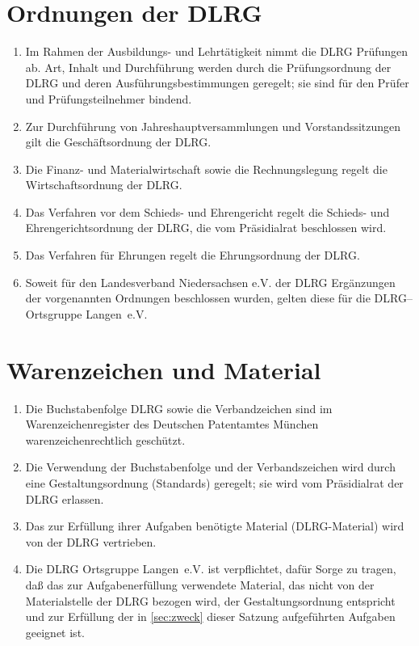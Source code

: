 \documentclass[%
12pt, %
a4paper, %
headsepline, %
footsepline, %
parskip, %
headings=normal, %
]{scrartcl}
\begin{document}
\section{Ordnungen der DLRG}
\label{sec:ordnungen}
\begin{enumerate}
    \item Im Rahmen der Ausbildungs- und Lehrtätigkeit nimmt die DLRG Prüfungen ab. Art, Inhalt und Durchführung werden durch die Prüfungsordnung der DLRG und deren Ausführungsbestimmungen geregelt; sie sind für den Prüfer und Prüfungsteilnehmer bindend.
    \item Zur Durchführung von Jahreshauptversammlungen und Vorstandssitzungen gilt die Geschäftsordnung der DLRG.
    \item Die Finanz- und Materialwirtschaft sowie die Rechnungslegung regelt die Wirtschaftsordnung der DLRG.
    \item Das Verfahren vor dem Schieds- und Ehrengericht regelt die Schieds- und Ehrengerichtsordnung der DLRG, die vom Präsidialrat beschlossen wird.
    \item Das Verfahren für Ehrungen regelt die Ehrungsordnung der DLRG.
    \item Soweit für den Landesverband Niedersachsen e.V. der DLRG Ergänzungen der vorgenannten Ordnungen beschlossen wurden, gelten diese für die DLRG--Ortsgruppe Langen~e.V.
\end{enumerate}

\section{Warenzeichen und Material}
\label{sec:warenzeichen}
\begin{enumerate}
    \item Die Buchstabenfolge DLRG sowie die Verbandzeichen sind im Warenzeichenregister des Deutschen Patentamtes München warenzeichenrechtlich geschützt.
    \item Die Verwendung der Buchstabenfolge und der Verbandszeichen wird durch eine Gestaltungsordnung (Standards) geregelt; sie wird vom Präsidialrat der DLRG erlassen.
    \item Das zur Erfüllung ihrer Aufgaben benötigte Material (DLRG-Material) wird von der DLRG vertrieben.
    \item Die DLRG Ortsgruppe Langen~e.V. ist verpflichtet, dafür Sorge zu tragen, daß das zur Aufgabenerfüllung verwendete Material, das nicht von der Materialstelle der DLRG bezogen wird, der Gestaltungsordnung entspricht und zur Erfüllung der in \ref{sec:zweck} dieser Satzung aufgeführten Aufgaben geeignet ist.
\end{enumerate}
\end{document}
